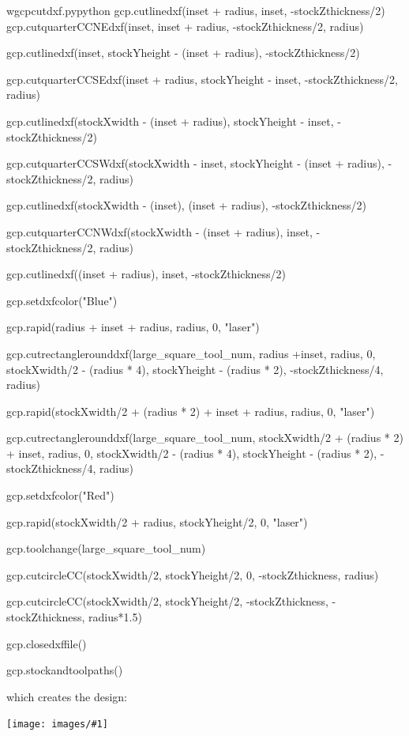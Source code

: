 \documentclass{ltxdoc}
\newcommand{\includeimage}[1]{\bigskip\noindent\texttt{[image: images/\#1]}\bigskip}
\begin{document}
\begin{writecode}{w}{gcpcutdxf.py}{python}
gcp.cutlinedxf(inset + radius, inset, -stockZthickness/2)
gcp.cutquarterCCNEdxf(inset, inset + radius, -stockZthickness/2, radius)

gcp.cutlinedxf(inset, stockYheight - (inset + radius), -stockZthickness/2)

gcp.cutquarterCCSEdxf(inset + radius, stockYheight - inset, -stockZthickness/2, radius)

gcp.cutlinedxf(stockXwidth - (inset + radius), stockYheight - inset, -stockZthickness/2)

gcp.cutquarterCCSWdxf(stockXwidth - inset, stockYheight - (inset + radius), -stockZthickness/2, radius)

gcp.cutlinedxf(stockXwidth - (inset), (inset + radius), -stockZthickness/2)

gcp.cutquarterCCNWdxf(stockXwidth - (inset + radius), inset, -stockZthickness/2, radius)

gcp.cutlinedxf((inset + radius), inset, -stockZthickness/2)

gcp.setdxfcolor("Blue")

gcp.rapid(radius + inset + radius, radius, 0, "laser")

gcp.cutrectanglerounddxf(large_square_tool_num, radius +inset, radius, 0, stockXwidth/2 - (radius * 4), stockYheight - (radius * 2), -stockZthickness/4, radius)

gcp.rapid(stockXwidth/2 + (radius * 2) + inset + radius, radius, 0, "laser")

gcp.cutrectanglerounddxf(large_square_tool_num, stockXwidth/2 + (radius * 2) + inset, radius, 0, stockXwidth/2 - (radius * 4), stockYheight - (radius * 2), -stockZthickness/4, radius)

gcp.setdxfcolor("Red")

gcp.rapid(stockXwidth/2 + radius, stockYheight/2, 0, "laser")

gcp.toolchange(large_square_tool_num)

gcp.cutcircleCC(stockXwidth/2, stockYheight/2, 0, -stockZthickness, radius)

gcp.cutcircleCC(stockXwidth/2, stockYheight/2, -stockZthickness, -stockZthickness, radius*1.5)

gcp.closedxffile()

gcp.stockandtoolpaths()

\end{writecode}

\noindent which creates the design:

\includeimage{gcpcutdxf.png}
\end{document}

